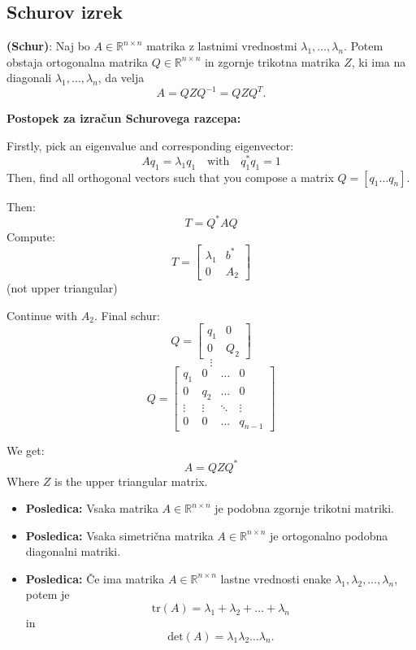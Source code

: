 \documentclass{article}
\begin{document}
\begin{multicols}{2}
\subsection{Schurov izrek}

\textbf{(Schur)}: Naj bo \( A \in \mathbb{R}^{n \times n} \) matrika z lastnimi vrednostmi \( \lambda_1, \ldots, \lambda_n \). Potem obstaja ortogonalna matrika \( Q \in \mathbb{R}^{n \times n} \) in zgornje trikotna matrika \( Z \), ki ima na diagonali \( \lambda_1, \ldots, \lambda_n \), da velja
\[ A = QZQ^{-1} = QZQ^T. \]

\textbf{Postopek za izračun Schurovega razcepa:}

Firstly, pick an eigenvalue and corresponding eigenvector:
\[
Aq_1 = \lambda_1 q_1 \quad \text{with} \quad q_1^*q_1=1
\]
Then, find all orthogonal vectors such that you compose a matrix \( Q = [q_1 \dots q_n] \).

Then:
\[
T = Q^*AQ
\]
Compute:
\[
T = \begin{bmatrix}
\lambda_1 & b^* \\
0 & A_2
\end{bmatrix}
\]
(not upper triangular)

Continue with \( A_2 \). Final schur:
\[
Q = \begin{bmatrix}
q_1 & 0 \\
0 & Q_2
\end{bmatrix}
\]
\[
\vdots
\]
\[
Q = \begin{bmatrix}
q_1 & 0 & \dots & 0 \\
0 & q_2 & \dots & 0 \\
\vdots & \vdots & \ddots & \vdots \\
0 & 0 & \dots & q_{n-1}
\end{bmatrix}
\]

We get:
\[
A = QZQ^*
\]
Where \( Z \) is the upper triangular matrix.


\begin{itemize}
    \item \textbf{Posledica:} Vsaka matrika \( A \in \mathbb{R}^{n \times n} \) je podobna zgornje trikotni matriki.
    
    \item \textbf{Posledica:} Vsaka simetrična matrika \( A \in \mathbb{R}^{n \times n} \) je ortogonalno podobna diagonalni matriki.
    
    \item \textbf{Posledica:} Če ima matrika \( A \in \mathbb{R}^{n \times n} \) lastne vrednosti enake \( \lambda_1, \lambda_2, \ldots, \lambda_n \), potem je
    \[
    \text{tr}(A) = \lambda_1 + \lambda_2 + \ldots + \lambda_n
    \]
    in
    \[
    \text{det}(A) = \lambda_1 \lambda_2 \ldots \lambda_n.
    \]
    

\end{itemize}
\end{multicols}
\end{document}
